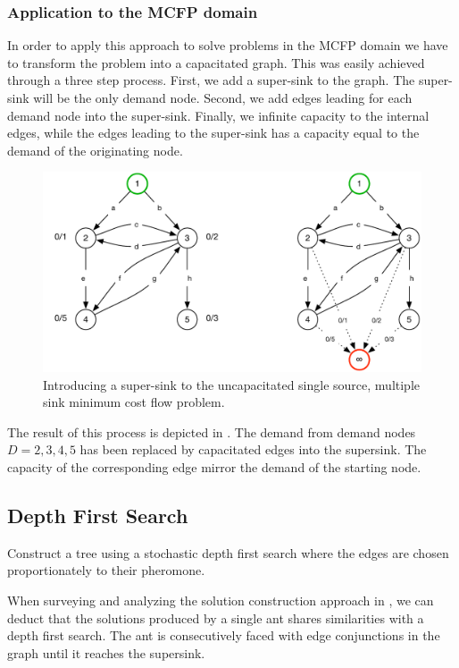 \subsubsection{Application to the MCFP domain}
In order to apply this approach to solve problems in the MCFP domain we have to transform the problem into a capacitated graph. This was easily achieved through a three step process. First, we add a super-sink to the graph. The super-sink will be the only demand node. Second, we add edges leading for each demand node into the super-sink. Finally, we infinite capacity to the internal edges, while the edges leading to the super-sink has a capacity equal to the demand of the originating node. 

\begin{figure}[htb]
   \center \includegraphics[width=0.8\linewidth,height=0.4\linewidth, keepaspectratio]{images/introduce_supersink.pdf}
   \caption[Introducting a super-sink to MCFP]{Introducing a super-sink to the uncapacitated single source, multiple sink minimum cost flow problem.}\label{fig:MCFP-supersink}
\end{figure}

The result of this process is depicted in . The demand from demand nodes $D = {2, 3, 4, 5}$ has been replaced by capacitated edges into the supersink. The capacity of the corresponding edge mirror the demand of the starting node.


\subsection{Depth First Search}
Construct a tree using a stochastic depth first search where the edges are chosen proportionately to their pheromone.

When surveying  and analyzing the solution construction approach in , we can deduct that the solutions produced by a single ant shares similarities with a depth first search. The ant is consecutively faced with edge conjunctions in the graph until it reaches the supersink.


